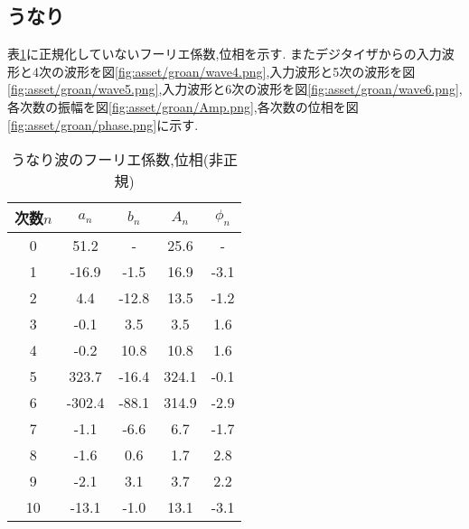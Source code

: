 \subsection{うなり}
表\ref{tab:groan_res}に正規化していないフーリエ係数,位相を示す.
またデジタイザからの入力波形と4次の波形を図\ref{fig:asset/groan/wave4.png},入力波形と5次の波形を図\ref{fig:asset/groan/wave5.png},入力波形と6次の波形を図\ref{fig:asset/groan/wave6.png},各次数の振幅を図\ref{fig:asset/groan/Amp.png},各次数の位相を図\ref{fig:asset/groan/phase.png}に示す.
\begin{table}[h]
   \caption{うなり波のフーリエ係数,位相(非正規)}
   \label{tab:groan_res}
   \centering
   \begin{tabular}{ccccc}
     \hline
     次数$n$&$a_n$&$b_n$&$A_n$&$\phi_n$\\
     \hline \hline
     0 & 51.2 & - & 25.6 & - \\
1 & -16.9 & -1.5 & 16.9 & -3.1 \\
2 & 4.4 & -12.8 & 13.5 & -1.2 \\
3 & -0.1 & 3.5 & 3.5 & 1.6 \\
4 & -0.2 & 10.8 & 10.8 & 1.6 \\
5 & 323.7 & -16.4 & 324.1 & -0.1 \\
6 & -302.4 & -88.1 & 314.9 & -2.9 \\
7 & -1.1 & -6.6 & 6.7 & -1.7 \\
8 & -1.6 & 0.6 & 1.7 & 2.8 \\
9 & -2.1 & 3.1 & 3.7 & 2.2 \\
10 & -13.1 & -1.0 & 13.1 & -3.1 \\
     \hline
   \end{tabular}
\end{table}

\begin{figure}[htbp]
  \begin{minipage}{0.5\hsize}
  \end{minipage}
  \begin{minipage}{0.5\hsize}
  \end{minipage} 
\end{figure}

\begin{figure}[htbp]
  \begin{minipage}{0.5\hsize}
  \end{minipage}
  \begin{minipage}{0.5\hsize}
  \end{minipage} 
\end{figure}
